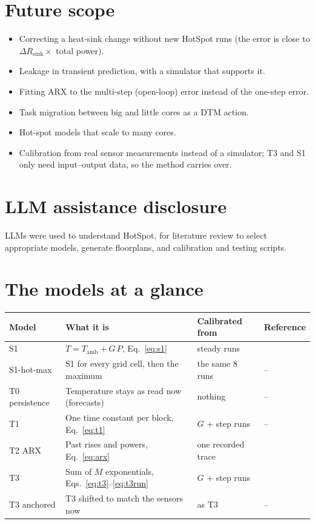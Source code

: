 \documentclass[11pt,a4paper]{article}
\begin{document}
\section{Future scope}
\begin{itemize}
  \item Correcting a heat-sink change without new HotSpot runs (the error is close to
        $\Delta R_\text{sink}\times$ total power).
  \item Leakage in transient prediction, with a simulator that supports it.
  \item Fitting ARX to the multi-step (open-loop) error instead of the one-step error.
  \item Task migration between big and little cores as a DTM action.
  \item Hot-spot models that scale to many cores.
  \item Calibration from real sensor measurements instead of a simulator; T3 and S1 only need
        input--output data, so the method carries over.
\end{itemize}

\section{LLM assistance disclosure}
LLMs were used to understand HotSpot, for literature review to select appropriate models, generate
floorplans, and calibration and testing scripts.

\appendix
\section{The models at a glance}
\begin{center}
\small
\begin{tabular}{@{}>{\raggedright\arraybackslash}p{2.4cm} >{\raggedright\arraybackslash}p{7.2cm} >{\raggedright\arraybackslash}p{3.6cm} >{\raggedright\arraybackslash}p{1.6cm}@{}}
\toprule
Model & What it is & Calibrated from & Reference \\
\midrule
S1 & $T = T_\text{amb} + G\,P$, Eq.~\eqref{eq:s1} & 8 steady runs & \cite{hotspot} \\
S1-hot-max & S1 for every grid cell, then the maximum & the same 8 runs & -- \\
T0 persistence & Temperature stays as read now (forecasts) & nothing & -- \\
T1 & One time constant per block, Eq.~\eqref{eq:t1} & $G$ + step runs & -- \\
T2 ARX & Past rises and powers, Eq.~\eqref{eq:arx} & one recorded trace & \cite{coskun09,singla15} \\
T3 & Sum of $M$ exponentials, Eqs.~\eqref{eq:t3}--\eqref{eq:t3run} & $G$ + step runs & \cite{pagani15,golub73} \\
T3 anchored & T3 shifted to match the sensors now & as T3 & -- \\
\bottomrule
\end{tabular}
\end{center}
\end{document}
